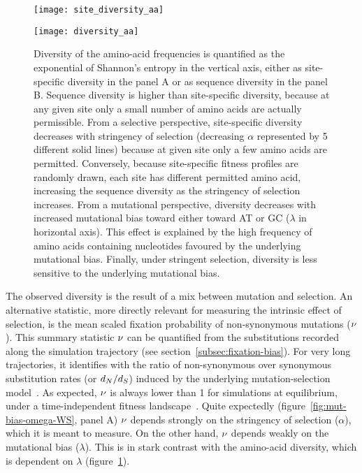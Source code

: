 \begin{figure}[htbp]
    \centering
    \begin{minipage}{0.49\linewidth}
        \texttt{[image: site\_diversity\_aa]}
    \end{minipage}
    \hfill
    \begin{minipage}{0.49\linewidth}
        \texttt{[image: diversity\_aa]}
    \end{minipage}
    \hfill
    \caption[Diversity of amino acids]{
    Diversity of the amino-acid frequencies is quantified as the exponential of Shannon's entropy in the vertical axis, either as site-specific diversity in the panel A or as sequence diversity in the panel B.
    Sequence diversity is higher than site-specific diversity, because at any given site only a small number of amino acids are actually permissible.
    From a selective perspective, site-specific diversity decreases with stringency of selection (decreasing $\alpha$ represented by 5 different solid lines) because at given site only a few amino acids are permitted.
    Conversely, because site-specific fitness profiles are randomly drawn, each site has different permitted amino acid, increasing the sequence diversity as the stringency of selection increases.
    From a mutational perspective, diversity decreases with increased mutational bias toward either toward AT or GC ($\lambda$ in horizontal axis).
    This effect is explained by the high frequency of amino acids containing nucleotides favoured by the underlying mutational bias.
    Finally, under stringent selection, diversity is less sensitive to the underlying mutational bias.}
    \label{fig:mut-bias-diversity-aa}
\end{figure}

The observed diversity is the result of a mix between mutation and selection.
An alternative statistic, more directly relevant for measuring the intrinsic effect of selection, is the mean scaled fixation probability of \gls{non-synonymous} mutations ($\nu$).
This summary statistic $\nu$ can be quantified from the \glspl{substitution} recorded along the simulation trajectory (see section~\ref{subsec:fixation-bias}).
For very long trajectories, it identifies with the ratio of \gls{non-synonymous} over \gls{synonymous} \gls{substitution} rates (or $d_N / d_S$) induced by the underlying mutation-selection model~\citep{Spielman2015, DosReis2015, Jones2016}.
As expected, $\nu$ is always lower than 1 for simulations at equilibrium, under a time-independent fitness landscape~\citep{Spielman2015}.
Quite expectedly (figure~\ref{fig:mut-bias-omega-WS}, panel A) $\nu$ depends strongly on the stringency of selection ($\alpha$), which it is meant to measure.
On the other hand, $\nu$ depends weakly on the mutational bias ($\lambda$).
This is in stark contrast with the amino-acid diversity, which is dependent on $\lambda$ (figure~\ref{fig:mut-bias-diversity-aa}).

